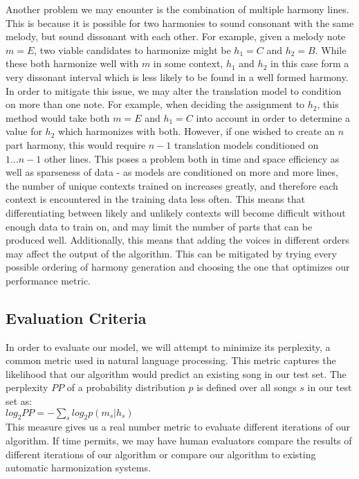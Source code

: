 \documentclass{sig-alternate}
\begin{document}
Another problem we may enounter is the combination of multiple harmony lines. This is because it is possible
for two harmonies to sound consonant with the same melody, but sound dissonant with each other. For example, given a melody note
$m = E$, two viable candidates to harmonize might be $h_1 = C$ and $h_2 = B$. While these both harmonize well with $m$ in some context, $h_1$ and $h_2$ in this case form a very dissonant interval which is less likely to be found in a well formed harmony. In order to mitigate this issue, we may alter the translation model to condition on more than one note. For example, when deciding the assignment to $h_2$, this method would take both $m = E$ and $h_1 = C$ into account in order to determine a value for $h_2$ which harmonizes with both. However, if one wished to create an $n$ part harmony, this would require $n - 1$ translation models conditioned on $1 \ldots n-1$ other lines. This poses a problem both in time and space efficiency as well as sparseness of data - as models are conditioned on more and more lines, the number of unique contexts trained on increases greatly, and therefore each context is encountered in the training data less often.
This means that differentiating between likely and unlikely contexts will become difficult without enough data to train on, and may
limit the number of parts that can be produced well. Additionally, this means that adding the voices in different orders may affect
the output of the algorithm. This can be mitigated by trying every possible ordering of harmony generation and choosing the one that optimizes our performance metric.

\subsection{Evaluation Criteria}
\label{subsec:eval_criteria}
In order to evaluate our model, we will attempt to minimize its perplexity, a common metric used in natural language 
processing. This metric captures the likelihood that our algorithm would predict an existing song in our test set. The perplexity $PP$ \cite{Koehn:2010:SMT:1734086} of a probability distribution $p$ is defined over all songs $s$ in our test set as:\\

$log_2 PP = - \sum_{s} log_2 p(m_s|h_s)$\\

This measure gives us a real number metric to evaluate different iterations of our algorithm. If time permits, we may have
human evaluators compare the results of different iterations of our algorithm or compare our algorithm to existing 
automatic harmonization systems.
\end{document}
